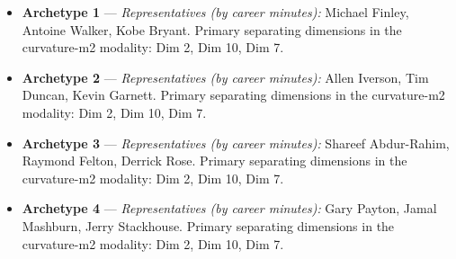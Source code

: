 \begin{itemize}
\item \textbf{Archetype 1} --- \emph{Representatives (by career minutes):} Michael Finley, Antoine Walker, Kobe Bryant. Primary separating dimensions in the curvature-m2 modality: Dim 2, Dim 10, Dim 7.
\item \textbf{Archetype 2} --- \emph{Representatives (by career minutes):} Allen Iverson, Tim Duncan, Kevin Garnett. Primary separating dimensions in the curvature-m2 modality: Dim 2, Dim 10, Dim 7.
\item \textbf{Archetype 3} --- \emph{Representatives (by career minutes):} Shareef Abdur-Rahim, Raymond Felton, Derrick Rose. Primary separating dimensions in the curvature-m2 modality: Dim 2, Dim 10, Dim 7.
\item \textbf{Archetype 4} --- \emph{Representatives (by career minutes):} Gary Payton, Jamal Mashburn, Jerry Stackhouse. Primary separating dimensions in the curvature-m2 modality: Dim 2, Dim 10, Dim 7.
\end{itemize}
